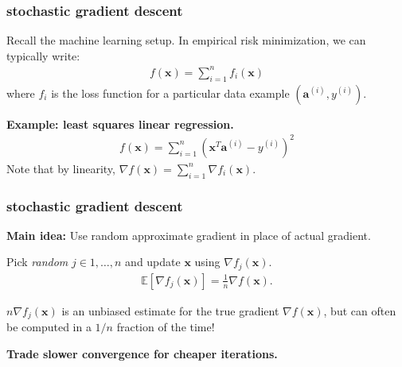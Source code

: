 \documentclass[compress]{beamer}
\newcommand{\bv}[1]{\mathbf{#1}}
\newcommand{\E}{\mathbb{E}}
\begin{document}
\begin{frame}[t]
	\frametitle{stochastic gradient descent}
	Recall the machine learning setup. In empirical risk minimization, we can typically write:
	\begin{align*}
		f(\bv{x}) = \sum_{i=1}^n f_i(\bv{x})
	\end{align*}
	where $f_i$ is the loss function for a particular data example $(\bv{a}^{(i)},y^{(i)} )$.
	\vspace{1em}
	
	\textbf{Example: least squares linear regression.}
	\begin{align*}
		f(\bv{x}) = \sum_{i=1}^n (\bv{x}^T\bv{a}^{(i)} - y^{(i)})^2
	\end{align*}
Note that by linearity, $\nabla f(\bv{x}) = \sum_{i=1}^n \nabla f_i(\bv{x})$. 
\end{frame}

\begin{frame}
	\frametitle{stochastic gradient descent}
	{\textbf{Main idea:} Use random approximate gradient in place of actual gradient.}
	
	Pick \emph{random} $j \in 1, \ldots, n$ and update $\bv{x}$  using $\nabla f_j(\bv{x})$. 
	\begin{align*}
		\E\left[\nabla f_j(\bv{x})\right] = \frac{1}{n}\nabla f(\bv{x}).
	\end{align*}

\vspace{2em}
	$n \nabla f_j(\bv{x})$ is an unbiased estimate for the true gradient $\nabla f(\bv{x})$, but can often be computed in a $1/n$ fraction of the time!
	

	
	\begin{center}
		\alert{\textbf{Trade slower convergence for cheaper iterations.}}
	\end{center}
\end{frame}
\end{document}

